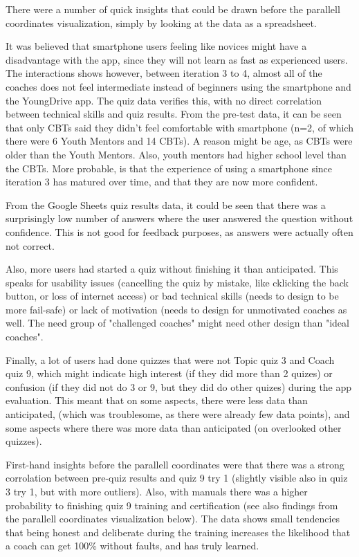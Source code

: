 There were a number of quick insights that could be drawn before the parallell coordinates visualization, simply by looking at the data as a spreadsheet.

It was believed that smartphone users feeling like novices might have a disadvantage with the app, since they will not learn as fast as experienced users. The interactions shows however, between iteration 3 to 4, almost all of the coaches does not feel intermediate instead of beginners using the smartphone and the YoungDrive app. The quiz data verifies this, with no direct correlation between technical skills and quiz results. From the pre-test data, it can be seen that only CBTs said they didn't feel comfortable with smartphone (n=2, of which there were 6 Youth Mentors and 14 CBTs). A reason might be age, as CBTs were older than the Youth Mentors. Also, youth mentors had higher school level than the CBTs. More probable, is that the experience of using a smartphone since iteration 3 has matured over time, and that they are now more confident. %

From the Google Sheets quiz results data, it could be seen that there was a surprisingly low number of answers where the user answered the question without confidence.  This is not good for feedback purposes, as answers were actually often not correct.

Also, more users had started a quiz without finishing it than anticipated. This speaks for usability issues (cancelling the quiz by mistake, like cklicking the back button, or loss of internet access) or bad technical skills (needs to design to be more fail-safe) or lack of motivation (needs to design for unmotivated coaches as well. The need group of "challenged coaches" might need other design than "ideal coaches".

Finally, a lot of users had done quizzes that were not Topic quiz 3 and Coach quiz 9, which might indicate high interest (if they did more than 2 quizes) or confusion (if they did not do 3 or 9, but they did do other quizes) during the app evaluation. This meant that on some aspects, there were less data than anticipated, (which was troublesome, as there were already few data points), and some aspects where there was more data than anticipated (on overlooked other quizzes).

First-hand insights before the parallell coordinates were that there was a strong corrolation between pre-quiz results and quiz 9 try 1 (slightly visible also in quiz 3 try 1, but with more outliers). Also, with manuals there was a higher probability to finishing quiz 9 training and certification (see also findings from the parallell coordinates visualization below). The data shows small tendencies that being honest and deliberate during the training increases the likelihood that a coach can get 100\% without faults, and has truly learned.

